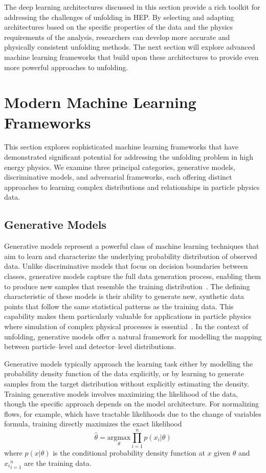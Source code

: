 The deep learning architectures discussed in this section provide a rich toolkit for addressing the challenges of unfolding in HEP.
%
By selecting and adapting architectures based on the specific properties of the data and the physics requirements of the analysis, researchers can develop more accurate and physically consistent unfolding methods.
%
The next section will explore advanced machine learning frameworks that build upon these architectures to provide even more powerful approaches to unfolding.

\section{Modern Machine Learning Frameworks}
This section explores sophisticated machine learning frameworks that have demonstrated significant potential for addressing the unfolding problem in high energy physics.
%
We examine three principal categories, generative models, discriminative models, and adversarial frameworks, each offering distinct approaches to learning complex distributions and relationships in particle physics data.
\subsection{Generative Models}
    Generative models represent a powerful class of machine learning techniques that aim to learn and characterize the underlying probability distribution of observed data.
    Unlike discriminative models that focus on decision boundaries between classes, generative models capture the full data generation process, enabling them to produce new samples that resemble the training distribution~\cite{Kansal2023EvaluatingPhysics}.
    The defining characteristic of these models is their ability to generate new, synthetic data points that follow the same statistical patterns as the training data.
    This capability makes them particularly valuable for applications in particle physics where simulation of complex physical processes is essential~\cite{Carleo2019MachineSciences, Albergo2019Flow-basedSHANAHAN}.
    In the context of unfolding, generative models offer a natural framework for modelling the mapping between particle--level and detector--level distributions.
    
    Generative models typically approach the learning task either by modelling the probability density function of the data explicitly, or by learning to generate samples from the target distribution without explicitly estimating the density.
    Training generative models involves maximizing the likelihood of the data, though the specific approach depends on the model architecture.
    For normalizing flows, for example, which have tractable likelihoods due to the change of variables formula, training directly maximizes the exact likelihood
    \begin{equation}
        \hat{\theta} = \underset{\theta}{\text{argmax}} \prod_{i=1}^{n} p(x_i | \theta)
    \end{equation}
    where \(p(x | \theta)\) is the conditional probability density function at \(x\) given \(\theta\) and \({x_i}_{i=1}^{n}\) are the training data.
    
